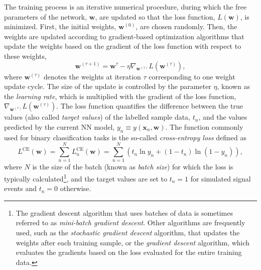 The training process is an iterative numerical procedure, during which the free parameters of the network, $\pmb{w}$, are updated so that the loss function, $L(\pmb{w})$, is minimized. 
First, the initial weights, $\pmb{w}^{(0)}$, are chosen randomly. Then, the weights are updated according to gradient-based optimization algorithms that update the weights based on the gradient of the loss function with respect to these weights, 
\begin{equation}
    \label{eq:gradient-descent}
    \pmb{w}^{(\tau+1)} = \pmb{w}^\tau - \eta \nabla_{\pmb{w}^{(\tau)}} L(\pmb{w}^{(\tau)}),
\end{equation}
where $\pmb{w}^{(\tau)}$ denotes the weights at iteration $\tau$ corresponding to one weight update cycle.
The size of the update is controlled by the parameter $\eta$, known as the \emph{learning rate}, which is multiplied with the gradient of the loss function, $\nabla_{\pmb{w}^{(\tau)}} L(\pmb{w}^{(\tau)})$.
The loss function quantifies the difference between the true values (also called \emph{target values}) of the labelled sample data, $t_n$, and the values predicted by the current NN model, $y_n \equiv y(\pmb{x}_n, \pmb{w})$. 
The function commonly used for binary classification tasks is the so-called \emph{cross-entropy loss} defined as
\begin{equation}
    \label{eq:cross-entropy-loss}
    L^{\text{CE}}(\pmb{w}) = \sum _{n=1}^{N}L_n^{\text{CE}}(\pmb{w}) = \sum _{n=1}^{N}\left( t_n \ln y_n + ( 1 - t_n) \ln (1 - y_n) \right),
\end{equation}
where $N$ is the size of the batch (known as \emph{batch size}) for which the loss is typically calculated\footnote{The gradient descent algorithm that uses batches of data is sometimes referred to as \emph{mini-batch gradient descent}. Other algorithms are frequently used, such as the \emph{stochastic gradient descent} algorithm, that updates the weights after each training sample, or the \emph{gradient descent} algorithm, which evaluates the gradients based on the loss evaluated for the entire training data.}, and the target values are set to $t_n = 1$ for simulated signal events and $t_n = 0$ otherwise.
